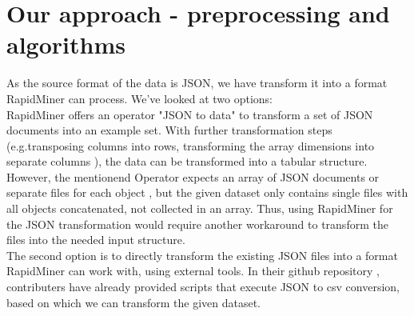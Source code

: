 \section{Our approach - preprocessing and algorithms} %
\label{cha:approach}
As the source format of the data is JSON, we have transform it into a format RapidMiner can process. We've looked at two options:\\
RapidMiner offers an operator "JSON to data" to transform a set of JSON documents into an example set. With further transformation steps (e.g.transposing columns into rows, transforming the array dimensions into separate columns%
), the data can be transformed into a tabular structure. However, the mentionend Operator expects an array of JSON documents or separate files for each object%
, but the given dataset only contains single files with all objects concatenated, not collected in an array. Thus, using RapidMiner for the JSON transformation would require another workaround to transform the files into the needed input structure.\\ %
The second option is to directly transform the existing JSON files into a format RapidMiner can work with, using external tools. In their github repository %
, contributers have already provided scripts that execute JSON to csv conversion, based on which we can transform the given dataset. %

